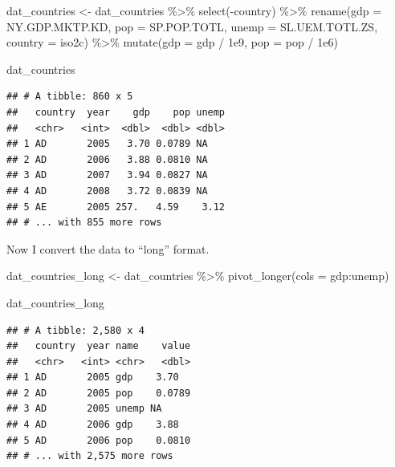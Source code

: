 \documentclass[
  12pt,
  oneside,openany]{book}
\newenvironment{Shaded}{\begin{snugshade}}{\end{snugshade}}
\newcommand{\AttributeTok}[1]{\textcolor[rgb]{0.77,0.63,0.00}{#1}}
\newcommand{\FloatTok}[1]{\textcolor[rgb]{0.00,0.00,0.81}{#1}}
\newcommand{\FunctionTok}[1]{\textcolor[rgb]{0.00,0.00,0.00}{#1}}
\newcommand{\NormalTok}[1]{#1}
\newcommand{\OtherTok}[1]{\textcolor[rgb]{0.56,0.35,0.01}{#1}}
\newcommand{\SpecialCharTok}[1]{\textcolor[rgb]{0.00,0.00,0.00}{#1}}
\begin{document}
\begin{Shaded}
\begin{Highlighting}[]
\NormalTok{dat\_countries }\OtherTok{\textless{}{-}}\NormalTok{ dat\_countries }\SpecialCharTok{\%\textgreater{}\%}
  \FunctionTok{select}\NormalTok{(}\SpecialCharTok{{-}}\NormalTok{country) }\SpecialCharTok{\%\textgreater{}\%}
  \FunctionTok{rename}\NormalTok{(}\AttributeTok{gdp =}\NormalTok{ NY.GDP.MKTP.KD,}
         \AttributeTok{pop =}\NormalTok{ SP.POP.TOTL,}
         \AttributeTok{unemp =}\NormalTok{ SL.UEM.TOTL.ZS,}
         \AttributeTok{country =}\NormalTok{ iso2c) }\SpecialCharTok{\%\textgreater{}\%}
  \FunctionTok{mutate}\NormalTok{(}\AttributeTok{gdp =}\NormalTok{ gdp }\SpecialCharTok{/} \FloatTok{1e9}\NormalTok{,}
         \AttributeTok{pop =}\NormalTok{ pop }\SpecialCharTok{/} \FloatTok{1e6}\NormalTok{)}

\NormalTok{dat\_countries}
\end{Highlighting}
\end{Shaded}

\begin{verbatim}
## # A tibble: 860 x 5
##   country  year    gdp    pop unemp
##   <chr>   <int>  <dbl>  <dbl> <dbl>
## 1 AD       2005   3.70 0.0789 NA   
## 2 AD       2006   3.88 0.0810 NA   
## 3 AD       2007   3.94 0.0827 NA   
## 4 AD       2008   3.72 0.0839 NA   
## 5 AE       2005 257.   4.59    3.12
## # ... with 855 more rows
\end{verbatim}

Now I convert the data to ``long'' format.

\begin{Shaded}
\begin{Highlighting}[]
\NormalTok{dat\_countries\_long }\OtherTok{\textless{}{-}}\NormalTok{ dat\_countries }\SpecialCharTok{\%\textgreater{}\%}
  \FunctionTok{pivot\_longer}\NormalTok{(}\AttributeTok{cols =}\NormalTok{ gdp}\SpecialCharTok{:}\NormalTok{unemp)}

\NormalTok{dat\_countries\_long}
\end{Highlighting}
\end{Shaded}

\begin{verbatim}
## # A tibble: 2,580 x 4
##   country  year name    value
##   <chr>   <int> <chr>   <dbl>
## 1 AD       2005 gdp    3.70  
## 2 AD       2005 pop    0.0789
## 3 AD       2005 unemp NA     
## 4 AD       2006 gdp    3.88  
## 5 AD       2006 pop    0.0810
## # ... with 2,575 more rows
\end{verbatim}
\end{document}
